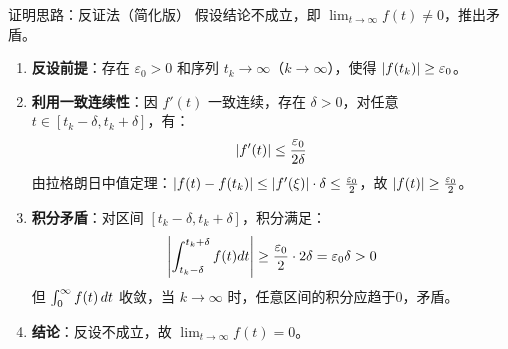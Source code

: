 \begin{frame}{证明思路：反证法（简化版）}
  假设结论不成立，即 $\lim_{t \to \infty} f(t) \neq 0$，推出矛盾。

  \begin{enumerate}
    \item \textbf{反设前提}：存在 $\varepsilon_0 > 0$ 和序列 $t_k \to \infty$（$k \to \infty$），使得 $\left| f(t_k) \right| \geq \varepsilon_0$。
    
    \item \textbf{利用一致连续性}：因 $f'(t)$ 一致连续，存在 $\delta > 0$，对任意 $t \in [t_k - \delta, t_k + \delta]$，有：
    \[ \left| f'(t) \right| \leq \frac{\varepsilon_0}{2\delta} \]
    由拉格朗日中值定理：$\left| f(t) - f(t_k) \right| \leq \left| f'(\xi) \right| \cdot \delta \leq \frac{\varepsilon_0}{2}$，故 $\left| f(t) \right| \geq \frac{\varepsilon_0}{2}$。

    \item \textbf{积分矛盾}：对区间 $[t_k - \delta, t_k + \delta]$，积分满足：
    \[ \left| \int_{t_k - \delta}^{t_k + \delta} f(t)dt \right| \geq \frac{\varepsilon_0}{2} \cdot 2\delta = \varepsilon_0 \delta > 0 \]
    但 $\int_{0}^{\infty} f(t) \, dt$ 收敛，当 $k \to \infty$ 时，任意区间的积分应趋于0，矛盾。

    \item \textbf{结论}：反设不成立，故 $\lim_{t \to \infty} f(t) = 0$。
  \end{enumerate}
\end{frame}

